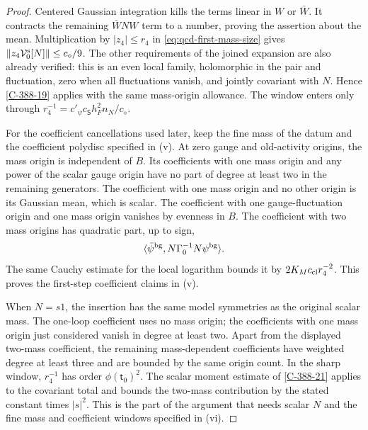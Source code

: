 \documentclass[11pt,letterpaper,reqno]{amsart}
\theoremstyle{definition}
\theoremstyle{remark}
\begin{document}
\begin{proof}
Centered Gaussian integration kills the terms linear in $W$ or
$\bar W$.  It contracts the remaining $\bar WNW$ term to a
number, proving the assertion about the mean.  Multiplication by
$|z_4|\le r_4$ in \eqref{eq:qcd-first-mass-size} gives
$\|z_4\mathcal V^{\rm s}_0[N]\|\le c_\diamond/9$.
The other requirements of the joined expansion are also already
verified: this is an even local family, holomorphic in the pair
and fluctuation, zero when all fluctuations vanish, and jointly
covariant with $N$.  Hence \cref{C-388-19} applies with the same
mass-origin allowance.  The window enters only through
$r_4^{-1}=c'_\psi c_{\mathsf S}h_F^2n_N/c_\diamond$.

For the coefficient cancellations used later, keep the fine mass
of the datum and the coefficient polydisc specified in (v).
At zero gauge and old-activity origins, the mass
origin is independent of $B$.  Its coefficients with one mass
origin and any power of the scalar gauge origin have no part of
degree at least two in the remaining generators.  The coefficient
with one mass origin and no other origin is its Gaussian mean,
which is scalar.  The coefficient with one gauge-fluctuation
origin and one mass origin vanishes by evenness in $B$.
The coefficient with two mass origins has quadratic part, up to
sign,
\[
 \langle\bar\psi^{\rm bg},N\Gamma_0^{-1}N\psi^{\rm bg}\rangle.
\]
The same Cauchy estimate for the local logarithm bounds it by
$2K_Mc_{\rm cl}r_4^{-2}$.  This proves the first-step coefficient
claims in (v).

When $N=s1$, the insertion has the same model symmetries as the
original scalar mass.  The one-loop coefficient uses no mass
origin; the coefficients with one mass origin just considered
vanish in degree at least two.  Apart from the displayed
two-mass coefficient, the remaining mass-dependent coefficients
have weighted degree at least three and are bounded by the same
origin count.  In the sharp window, $r_4^{-1}$ has order
$\phi(\mathsf t_0)^2$.  The scalar moment estimate of
\cref{C-388-21} applies to the covariant total and bounds the
two-mass contribution by the stated constant times $|s|^2$.
This is the part of the argument that needs scalar $N$ and the
fine mass and coefficient windows specified in (vi).
\end{proof}
\end{document}

